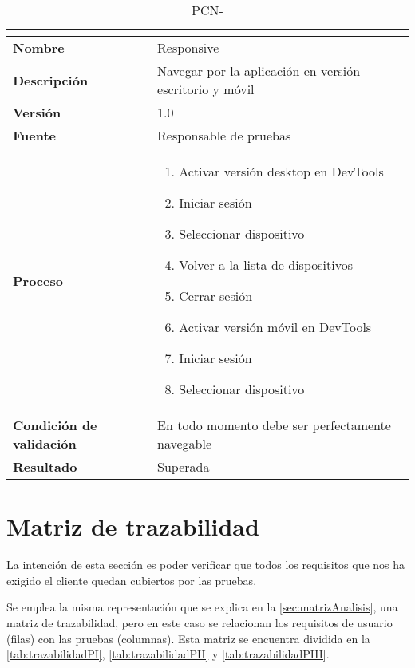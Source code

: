 \begin{table}[H]
	\caption{PCN-\number\pcn}
	\begin{tabular}{|l|p{}|}
		\hline
		\multicolumn{2}{|c|}{\cellcolor[HTML]{BFBFBF}{\color[HTML]{000000} \textbf{PCN-\number\pcn}}} \\ \hline
		\textbf{Nombre}                  & Responsive                                              \\ \hline
		\textbf{Descripción}             & Navegar por la aplicación en versión escritorio y móvil \\ \hline
		\textbf{Versión}                 & 1.0                                                     \\ \hline
		\textbf{Fuente}                  & Responsable de pruebas                                  \\ \hline
		\textbf{Proceso}                 & \begin{enumerate}
			\item Activar versión desktop en DevTools
			\item Iniciar sesión
			\item Seleccionar dispositivo
			\item Volver a la lista de dispositivos
			\item Cerrar sesión
			\item Activar versión móvil en DevTools
			\item Iniciar sesión
			\item Seleccionar dispositivo
		\end{enumerate}                              \\ \hline
		\textbf{Condición de validación} & En todo momento debe ser perfectamente navegable        \\ \hline
		\textbf{Resultado}               & Superada                                                \\ \hline
	\end{tabular}
\end{table}
\pagebreak

\section{Matriz de trazabilidad}\label{sec:matriz-de-trazabilidad}
La intención de esta sección es poder verificar que todos los requisitos que nos ha exigido el cliente quedan cubiertos por las pruebas. 

Se emplea la misma representación que se explica en la \autoref{sec:matrizAnalisis}, una matriz de trazabilidad, pero en este caso se relacionan los requisitos de usuario (filas) con las pruebas (columnas). Esta matriz se encuentra dividida en la \autoref{tab:trazabilidadPI}, \autoref{tab:trazabilidadPII} y \autoref{tab:trazabilidadPIII}.

